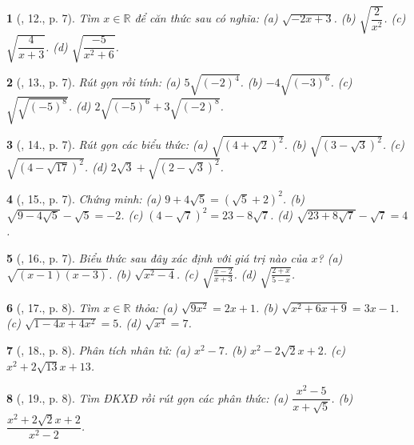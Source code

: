 \documentclass{article}
\newtheorem{baitoan}{}%
\begin{document}
\begin{baitoan}[\cite{SBT_Toan_9_tap_1}, 12., p. 7]
	Tìm $x\in\mathbb{R}$ để căn thức sau có nghĩa: (a) $\sqrt{-2x + 3}$. (b) $\sqrt{\dfrac{2}{x^2}}$. (c) $\sqrt{\dfrac{4}{x + 3}}$. (d) $\sqrt{\dfrac{-5}{x^2 + 6}}$.
\end{baitoan}

\begin{baitoan}[\cite{SBT_Toan_9_tap_1}, 13., p. 7]
	Rút gọn rồi tính: (a) $5\sqrt{(-2)^4}$. (b) $-4\sqrt{(-3)^6}$. (c) $\sqrt{\sqrt{(-5)^8}}$. (d) $2\sqrt{(-5)^6} + 3\sqrt{(-2)^8}$.
\end{baitoan}

\begin{baitoan}[\cite{SBT_Toan_9_tap_1}, 14., p. 7]
	Rút gọn các biểu thức: (a) $\sqrt{(4 + \sqrt{2})^2}$. (b) $\sqrt{(3 - \sqrt{3})^2}$. (c) $\sqrt{(4 - \sqrt{17})^2}$. (d) $2\sqrt{3} + \sqrt{(2 - \sqrt{3})^2}$.
\end{baitoan}

\begin{baitoan}[\cite{SBT_Toan_9_tap_1}, 15., p. 7]
	Chứng minh: (a) $9 + 4\sqrt{5} = (\sqrt{5} + 2)^2$. (b) $\sqrt{9 - 4\sqrt{5}} - \sqrt{5} = -2$. (c) $(4 - \sqrt{7})^2 = 23 - 8\sqrt{7}$. (d) $\sqrt{23 + 8\sqrt{7}} - \sqrt{7} = 4$.
\end{baitoan}

\begin{baitoan}[\cite{SBT_Toan_9_tap_1}, 16., p. 7]
	Biểu thức sau đây xác định với giá trị nào của $x$? (a) $\sqrt{(x - 1)(x - 3)}$. (b) $\sqrt{x^2 - 4}$. (c) $\sqrt{\frac{x - 2}{x + 3}}$. (d) $\sqrt{\frac{2 + x}{5 - x}}$.
\end{baitoan}

\begin{baitoan}[\cite{SBT_Toan_9_tap_1}, 17., p. 8]
	Tìm $x\in\mathbb{R}$ thỏa: (a) $\sqrt{9x^2} = 2x + 1$. (b) $\sqrt{x^2 + 6x + 9} = 3x - 1$. (c) $\sqrt{1 - 4x + 4x^2} = 5$. (d) $\sqrt{x^4} = 7$.
\end{baitoan}

\begin{baitoan}[\cite{SBT_Toan_9_tap_1}, 18., p. 8]
	Phân tích nhân tử: (a) $x^2 - 7$. (b) $x^2  - 2\sqrt{2}x + 2$. (c) $x^2 + 2\sqrt{13}x + 13$.
\end{baitoan}

\begin{baitoan}[\cite{SBT_Toan_9_tap_1}, 19., p. 8]
	Tìm ĐKXĐ rồi rút gọn các phân thức: (a) $\dfrac{x^2 - 5}{x + \sqrt{5}}$. (b) $\dfrac{x^2 + 2\sqrt{2}x + 2}{x^2 - 2}$.
\end{baitoan}
\end{document}
